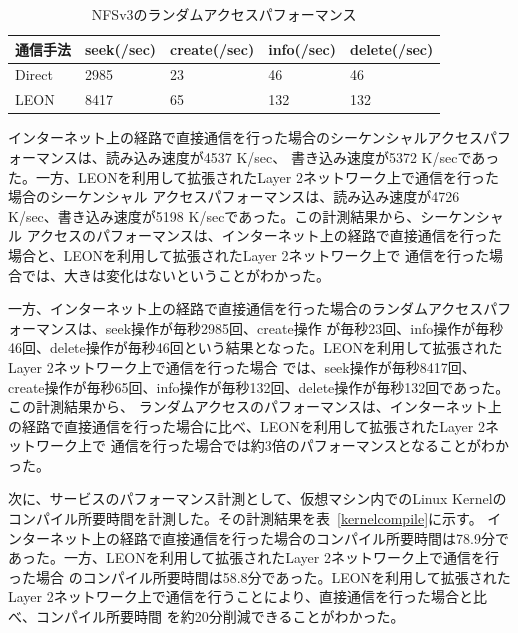 \begin{table}[h]
        \begin{center}
                \caption{NFSv3のランダムアクセスパフォーマンス}
                \begin{tabular}{|l|l|l|l|l|}
                        \hline
                                通信手法 & seek(/sec) & create(/sec) & info(/sec) & delete(/sec) \\
                        \hline
			\hline
                                Direct & 2985 & 23 & 46 & 46 \\
			\hline
				LEON & 8417 & 65 & 132 & 132\\
                        \hline
                \end{tabular}
                \label{nfsrand}
        \end{center}
\end{table}

インターネット上の経路で直接通信を行った場合のシーケンシャルアクセスパフォーマンスは、読み込み速度が4537 K/sec、
書き込み速度が5372 K/secであった。一方、LEONを利用して拡張されたLayer 2ネットワーク上で通信を行った場合のシーケンシャル
アクセスパフォーマンスは、読み込み速度が4726 K/sec、書き込み速度が5198 K/secであった。この計測結果から、シーケンシャル
アクセスのパフォーマンスは、インターネット上の経路で直接通信を行った場合と、LEONを利用して拡張されたLayer 2ネットワーク上で
通信を行った場合では、大きは変化はないということがわかった。

一方、インターネット上の経路で直接通信を行った場合のランダムアクセスパフォーマンスは、seek操作が毎秒2985回、create操作
が毎秒23回、info操作が毎秒46回、delete操作が毎秒46回という結果となった。LEONを利用して拡張されたLayer 2ネットワーク上で通信を行った場合
では、seek操作が毎秒8417回、create操作が毎秒65回、info操作が毎秒132回、delete操作が毎秒132回であった。この計測結果から、
ランダムアクセスのパフォーマンスは、インターネット上の経路で直接通信を行った場合に比べ、LEONを利用して拡張されたLayer 2ネットワーク上で
通信を行った場合では約3倍のパフォーマンスとなることがわかった。

次に、サービスのパフォーマンス計測として、仮想マシン内でのLinux Kernelのコンパイル所要時間を計測した。その計測結果を表~\ref{kernelcompile}に示す。
インターネット上の経路で直接通信を行った場合のコンパイル所要時間は78.9分であった。一方、LEONを利用して拡張されたLayer 2ネットワーク上で通信を行った場合
のコンパイル所要時間は58.8分であった。LEONを利用して拡張されたLayer 2ネットワーク上で通信を行うことにより、直接通信を行った場合と比べ、コンパイル所要時間
を約20分削減できることがわかった。

